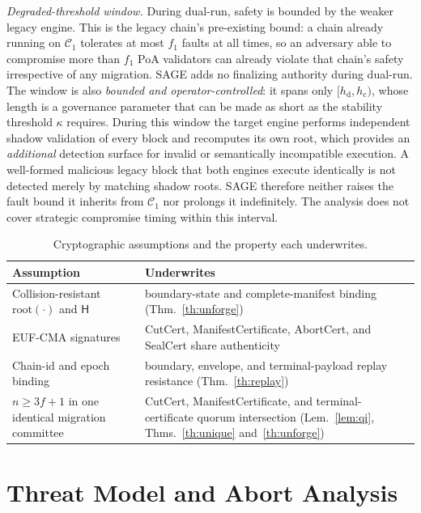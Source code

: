 \documentclass[journal]{IEEEtran}
\theoremstyle{definition}
\theoremstyle{remark}
\begin{document}
\emph{Degraded-threshold window.} During dual-run, safety is bounded by the weaker legacy engine.
This is the legacy chain's pre-existing bound: a chain already running on $\mathcal{C}_1$ tolerates at
most $f_1$ faults at all times, so an adversary able to compromise more than $f_1$ PoA validators
can already violate that chain's safety irrespective of any migration. SAGE adds no finalizing
authority during dual-run. The window is also \emph{bounded and operator-controlled}: it spans only
$[h_{\mathrm{d}}, h_{\mathrm{c}})$, whose length is a governance parameter that can be made as short
as the stability threshold $\kappa$ requires. During this window the target engine performs
independent shadow validation of every block and recomputes its own root, which provides an
\emph{additional} detection surface for invalid or semantically incompatible execution. A
well-formed malicious legacy block that both engines execute identically is not detected merely by
matching shadow roots. SAGE therefore neither raises the fault bound it inherits from
$\mathcal{C}_1$ nor prolongs it indefinitely. The analysis does not cover strategic compromise
timing within this interval.

\begin{table}[t]
\centering
\caption{Cryptographic assumptions and the property each underwrites.}
\label{tab:crypto}
\renewcommand{\arraystretch}{1.15}
\footnotesize
\begin{tabular}{L{0.30\columnwidth}L{0.60\columnwidth}}
\toprule
Assumption & Underwrites \\
\midrule
Collision-resistant $\mathrm{root}(\cdot)$ and $\mathsf{H}$ & boundary-state and complete-manifest binding (Thm.~\ref{th:unforge}) \\
EUF-CMA signatures & CutCert, ManifestCertificate, AbortCert, and SealCert share authenticity \\
Chain-id and epoch binding & boundary, envelope, and terminal-payload replay resistance (Thm.~\ref{th:replay}) \\
$n \ge 3f+1$ in one identical migration committee & CutCert, ManifestCertificate, and terminal-certificate quorum intersection (Lem.~\ref{lem:qi}, Thms.~\ref{th:unique} and~\ref{th:unforge}) \\
\bottomrule
\end{tabular}
\end{table}

\section{Threat Model and Abort Analysis}
\label{sec:threat}
\end{document}
